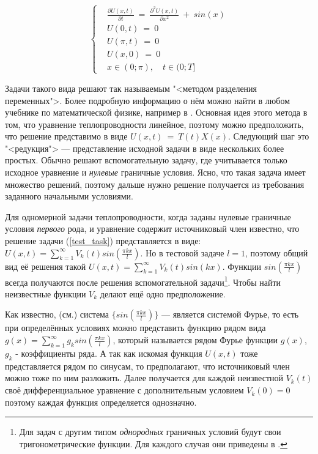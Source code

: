 \documentclass[oneside, final, 14pt]{report}
\begin{document}
\begin{equation}
\left\{\begin{aligned} 
&\frac{\partial U(x, t)}{\partial t} 
\ = \ 
\frac{\partial^2U(x, t)}{\partial x^2} \ + \ sin(x) \\
& U(0, t) \ = \ 0 \\
& U(\pi, t) \ = \ 0 \\
& U(x, 0) \ = \ 0 \\
& x \in ( 0; \pi ), \quad t \in ( 0; T]  
\end{aligned}\right. 
\label{test_task}
\end{equation}


Задачи такого вида решают так называемым "<методом разделения переменных">. Более подробную информацию о нём можно найти в любом учебнике по математической физике, например в \cite{bib:UMF_lectures}. Основная идея этого метода в том, что уравнение теплопроводности линейное, поэтому можно предположить, что решение представимо в виде $U(x,t) \ = \ T(t)X(x)$. Следующий шаг это "<редукция"> --- представление исходной задачи в виде нескольких более простых. Обычно решают вспомогательную задачу, где учитывается только исходное уравнение и \emph{нулевые} граничные условия. Ясно, что такая задача имеет множество решений, поэтому дальше нужно решение получается из требования заданного начальными условиями. 

Для одномерной задачи теплопроводности, когда заданы нулевые граничные условия \emph{первого} рода, и уравнение содержит источниковый член известно, что решение задачи (\ref{test_task}) представляется в виде: $U(x, t) = \sum\limits_{k=1}^{\infty}V_k(t)sin(\frac{\pi kx}{l})$. Но в тестовой задаче $l=1$, поэтому общий вид её решения такой $U(x, t) = \sum\limits_{k=1}^{\infty}V_k(t)sin(kx)$. Функции $sin(\frac{\pi kx}{l})$  всегда получаются после решения вспомогательной задачи\footnote{Для задач с другим типом \emph{однородных} граничных условий будут свои тригонометрические функции. Для каждого случая они приведены в \cite{bib:UMF_lectures}.}. Чтобы найти неизвестные функции $V_k$ делают ещё одно предположение. 


Как известно, (см.\cite{bib:Matan_uchebnik}) система $\{sin(\frac{\pi kx}{l})\}$ --- является системой Фурье, то есть при определённых условиях можно представить функцию рядом вида $g(x) = \sum\limits_{k=1}^{\infty}g_ksin(\frac{\pi kx}{l})$, который называется рядом Фурье функции $g(x)$, $g_k$ - коэффициенты ряда. А так как искомая функция $U(x, t)$ тоже представляется рядом по синусам, то предполагают, что источниковый член можно тоже по ним разложить. Далее получается для каждой неизвестной $V_k(t)$ своё дифференциальное уравнение с дополнительным условием $V_k(0) = 0$ поэтому каждая функция определяется однозначно. 
\end{document}
